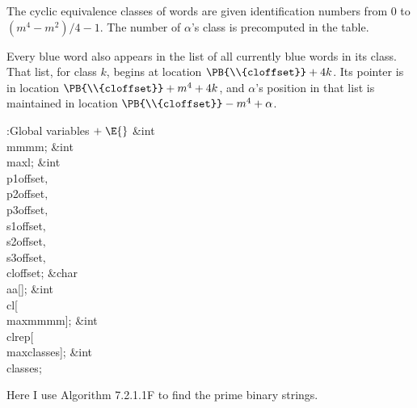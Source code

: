 The cyclic equivalence classes of words are given identification numbers
from
0 to $(m^4-m^2)/4-1$. The number of $\alpha$'s class is precomputed in
the  table.

Every blue word also appears in the list of all currently blue words
in its class. That list, for class $k$, begins at  location
$\PB{\\{cloffset}}+4k$. Its pointer is in  location
$\PB{\\{cloffset}}+m^4+4k$, and $\alpha$'s position in that list
is maintained in  location $\PB{\\{cloffset}}-m^4+\alpha$.

\Y\B\4:Global variables\X${}\mathrel+\E{}$\6
\&{int} \\{mmmm};\6
\&{int} \\{maxl};\6
\&{int} \\{p1offset}${},{}$ \\{p2offset}${},{}$ \\{p3offset}${},{}$ %
\\{s1offset}${},{}$ \\{s2offset}${},{}$ \\{s3offset}${},{}$ \\{cloffset};\6
\&{char} \\{aa}[];\6
\&{int} \\{cl}[\\{maxmmmm}];\6
\&{int} \\{clrep}[\\{maxclasses}];\6
\&{int} \\{classes};\par
\fi

Here I use Algorithm 7.2.1.1F to find the prime binary strings.

